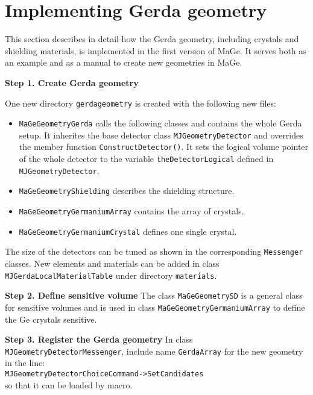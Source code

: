 \documentclass[a4paper,12pt,twoside]{article}
\begin{document}
\section{Implementing Gerda geometry}
This section describes in detail how the Gerda geometry, including
crystals and shielding materials, is implemented in the
first version of MaGe. It serves both as an example and as 
a manual to create new geometries in MaGe.

{\bf Step 1. Create Gerda geometry }

One new directory {\tt gerdageometry} is created with
the following new files: 
\begin{itemize} 
\item {\tt MaGeGeometryGerda} calls the following classes and
contains the whole Gerda setup. It inherites the base 
detector class {\tt MJGeometryDetector}
and overrides the member function {\tt ConstructDetector()}.
It sets the logical volume pointer of the whole detector
to the variable {\tt theDetectorLogical} defined in {\tt MJGeometryDetector}.
\item {\tt MaGeGeometryShielding} describes the shielding structure.
\item {\tt MaGeGeometryGermaniumArray} contains the array of crystals.
\item {\tt MaGeGeometryGermaniumCrystal} defines one single crystal.
\end{itemize}

The size of the detectors can be tuned as shown in the corresponding
{\tt Messenger} classes.
New elements and materials can be added in
class \\
{\tt MJGerdaLocalMaterialTable} under directory
{\tt materials}.


{\bf Step 2. Define sensitive volume}
The class {\tt MaGeGeometrySD} is a general class for sensitive
volumes and is used in class {\tt MaGeGeometryGermaniumArray}
to define the Ge crystals sensitive.

{\bf Step 3. Register the Gerda geometry}
In class {\tt MJGeometryDetectorMessenger},
include name {\tt GerdaArray} for the new geometry in the line: \\
{\tt MJGeometryDetectorChoiceCommand->SetCandidates} \\
so that it can be loaded by macro.
\end{document}
